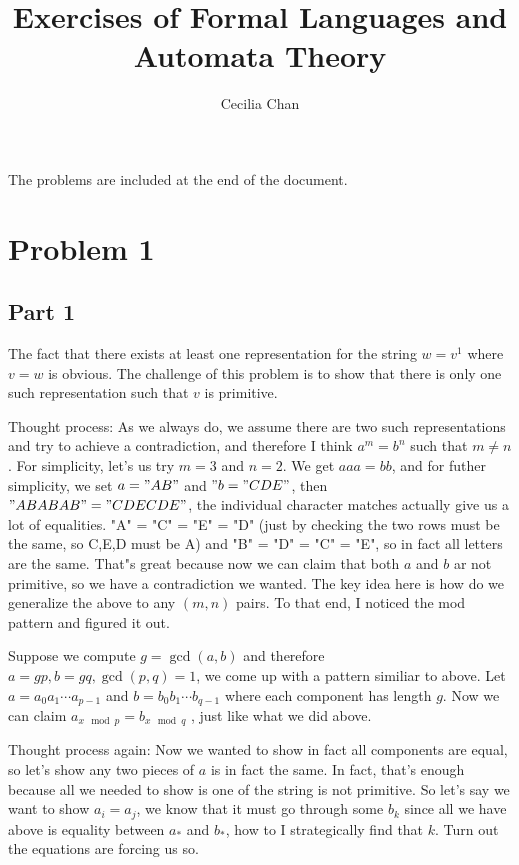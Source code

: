 \documentclass{article}
\title{Exercises of Formal Languages and Automata Theory}
\author{Cecilia Chan}
\begin{document}
\maketitle

The problems are included at the end of the document.



\section*{Problem 1}
\subsection*{Part 1}
The fact that there exists at least one representation for the string $ w = v^1 $ where $ v = w $ is obvious. The challenge of this problem is to show that there is only one such representation such that $ v $ is primitive.

Thought process: As we always do, we assume there are two such representations and try to achieve a contradiction, and therefore I think $ a^m = b^n $ such that $ m \ne n $. For simplicity, let's us try $ m = 3 $ and $ n = 2 $. We get $ aaa = bb $, and for futher simplicity, we set $ a = "AB" $ and $ "b = "CDE" $, then $ "ABABAB" = "CDECDE" $, the individual character matches actually give us a lot of equalities. "A" = "C" = "E" = "D"  (just by checking the two rows must be the same, so C,E,D must be A) and "B" = "D" = "C" = "E", so in fact all letters are the same. That"s great because now we can claim that both $ a $ and $ b $ ar not primitive, so we have a contradiction we wanted. The key idea here is how do we generalize the above to any $ (m, n) $ pairs. To that end, I noticed the mod pattern and figured it out.

Suppose we compute $ g = \gcd(a, b) $ and therefore $ a = gp, b = gq, \gcd(p, q) = 1 $, we come up with a pattern similiar to above. Let $ a = a_0 a_1 \cdots a_{p-1} $ and $ b = b_0 b_1 \cdots b_{q-1} $ where each component has length $ g $. Now we can claim $ a_{x \mod p} = b_{x \mod q} $ , just like what we did above.

Thought process again: Now we wanted to show in fact all components are equal, so let's show any two pieces of $ a $ is in fact the same. In fact, that's enough because all we needed to show is one of the string is not primitive. So let's say we want to show $ a_i = a_j $, we know that it must go through some $ b_k $ since all we have above is equality between $ a_* $ and $ b_* $, how to I strategically find that $ k $. Turn out the equations are forcing us so.
\end{document}
